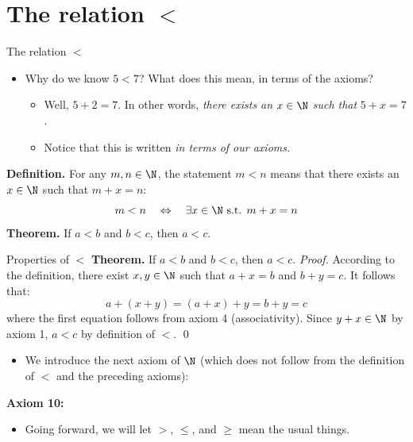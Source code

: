 \documentclass[11pt,aspectratio=1610,handout]{beamer}
\begin{document}
\section{The relation $<$}

\begin{frame}{The relation $<$}
	\vspace{-15mm}\p
	
	\begin{itemize}\itemsep5mm
		\item Why do we know $5 < 7$? What does this mean, in terms of the axioms? 
		\begin{itemize}\itemsep2mm
			\item Well, $5 + 2 = 7$. In other words, \emph{there exists an} $x \in \N$ \emph{such that} $5 + x= 7$. 
			\item Notice that this is written \emph{in terms of our axioms.}
		\end{itemize}
	\end{itemize}
	
	\vspace{5mm} \p
	
	\textbf{Definition.} For any $m, n \in \N$, the statement $m < n$ means that there exists an $x \in \N$ such that $m + x= n$: 
	\[
	m < n \quad \Leftrightarrow \quad \exists x \in \N \textrm{ s.t. } m + x = n
	\] \p
	\textbf{Theorem.} If $a < b$ and $b < c$, then $a < c$. 
\end{frame}

\begin{frame}{Properties of $<$}
	\textbf{Theorem.} If $a < b$ and $b < c$, then $a < c$. \p
	\newline\newline
	\textit{Proof.} According to the definition, there exist $x,y \in \N$ such that $a + x= b $ and $b + y = c $.  \p It follows that: 
	\[
	a + (x + y) = (a+x) + y = b + y = c
	\]  \p
	where the first equation follows from axiom 4 (associativity).  \p Since $y + x \in \N$ by axiom 1, $a < c$ by definition of $<$. \qed
	\begin{itemize}
		\item We introduce the next axiom of $\N$ (which does not follow from the definition of $<$ and the preceding axioms): 
	\end{itemize}  \p
	\textbf{Axiom 10:}
	
	\setcounter{enumi}{9}
	
		  \p
	
	\begin{itemize}
		\item Going forward, we will let $>$, $\leq$, and $\geq$ mean the usual things. 
	\end{itemize}
\end{frame}
\end{document}
